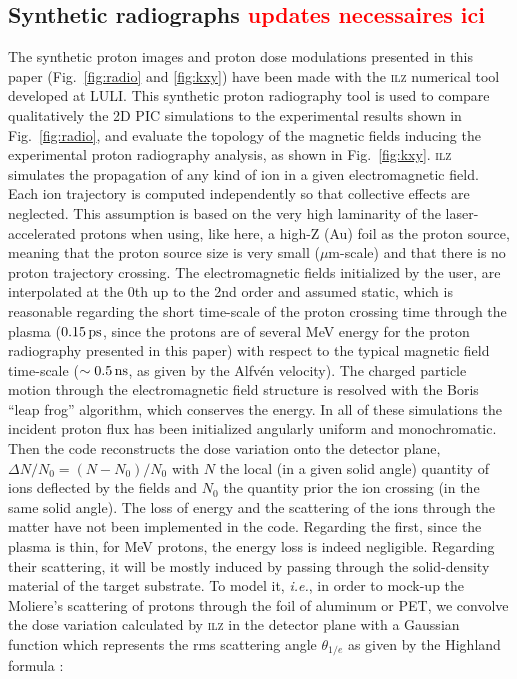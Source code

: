 \documentclass[aps,twocolumn,showpacs,superscriptaddress]{revtex4}
\begin{document}
\subsection*{Synthetic radiographs \textcolor{red}{updates necessaires ici}}
The synthetic proton images and proton dose modulations presented in this paper (Fig.~\ref{fig:radio} and  \ref{fig:kxy}) have been made with the \textsc{ilz} numerical tool developed at LULI. This synthetic proton radiography tool is used to compare qualitatively the 2D PIC simulations to the experimental results shown in Fig.~\ref{fig:radio}, and evaluate the topology of the magnetic fields inducing the experimental proton radiography analysis, as shown in Fig.~\ref{fig:kxy}.
\textsc{ilz} simulates the propagation of any kind of ion in a given electromagnetic field. Each ion trajectory is computed independently so that collective effects are neglected. This assumption is based on the very high laminarity of the laser-accelerated protons \cite{PRL_Cowan_2004, PRL_Fuchs_2003} when using, like here, a high-Z (Au) foil as the proton source, meaning that the proton source size is very small ($\mu$m-scale) and that there is no proton trajectory crossing. The electromagnetic  fields   initialized by the user, are interpolated at the 0th up to the 2nd order and assumed static, which is reasonable regarding the short time-scale of the proton crossing time through the plasma ($0.15\,\rm ps$, since the protons are of several MeV energy for the proton radiography presented in this paper) with respect to the typical magnetic field time-scale ($\sim 0.5\,\rm ns$, as given by the Alfv\'en velocity). The charged particle motion through the electromagnetic  field structure is resolved with the Boris “leap frog” algorithm, which conserves the energy. In all of these simulations the incident proton flux has been initialized angularly uniform and monochromatic. Then the code reconstructs the dose variation onto the detector plane, $\Delta N/N_0= (N- N_0)/N_0$ with $N$ the local (in a given solid angle) quantity of ions deflected by the fields and $N_0$ the quantity prior the ion crossing  (in the same solid angle). 
The loss of energy and the scattering of the ions through the matter have not been implemented in the code. Regarding the first, since the plasma is thin, for MeV protons, the energy loss is indeed negligible. Regarding their scattering, it will be mostly induced by passing through the solid-density material of the target substrate. To model it, \emph{i.e.}, in order to mock-up the Moliere's scattering of protons through the foil of aluminum or PET, we convolve the dose variation calculated by \textsc{ilz} in the detector plane with a Gaussian function which represents the rms scattering angle $\theta_{1/e}$ as given by the Highland formula \cite{NIM_Highland_1975}:
\end{document}
